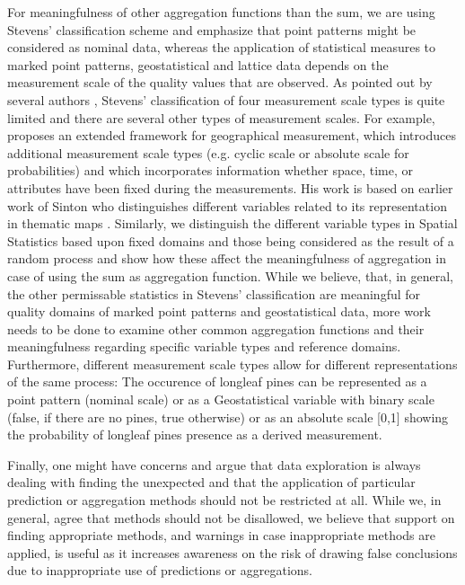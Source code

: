 \documentclass[final,authoryear,1p,times]{elsarticle}
\begin{document}
For meaningfulness of other aggregation functions than the sum, we are using Stevens' classification scheme \citep{Stevens1946} and emphasize that point patterns might be considered as nominal data, whereas the application of statistical measures to marked point patterns, geostatistical and lattice data depends on the measurement scale of the quality values that are observed. As pointed out by several authors \citep{Suppes1967,Hand1996,Chrisman1995}, Stevens' classification of four measurement scale types is quite limited and there are several other types of measurement scales. For example, \cite{Chrisman1995} proposes an extended framework for geographical measurement, which introduces additional measurement scale types (e.g. cyclic scale or absolute scale for probabilities) and which incorporates information whether space, time, or attributes have been fixed during the measurements. His work is based on earlier work of Sinton who distinguishes different variables related to its representation in thematic maps \citep{Sinton1978}. Similarly, we distinguish the different variable types in Spatial Statistics based upon fixed domains and those being considered as the result of a random process and show how these affect the meaningfulness of aggregation in case of using the sum as aggregation function. While we believe, that, in general, the other permissable statistics in Stevens' classification are meaningful for quality domains of marked point patterns and geostatistical data, more work needs to be done to examine other common aggregation functions and their meaningfulness regarding specific variable types and reference domains. Furthermore, different measurement scale types allow for different representations of the same process: The occurence of longleaf pines can be represented as a point pattern (nominal scale) or as a Geostatistical variable with binary scale (false, if there are no pines, true otherwise) or as an absolute scale [0,1] showing the probability of longleaf pines presence as a derived measurement.

Finally, one might have concerns and argue that data exploration is always dealing with finding the unexpected and that the application of particular prediction or aggregation methods should not be restricted at all. While we, in general, agree that methods should not be disallowed, we believe that support on finding appropriate methods, and warnings in case inappropriate methods are applied, is useful as it increases awareness on the risk of drawing false conclusions due to inappropriate use of predictions or aggregations.
\end{document}
